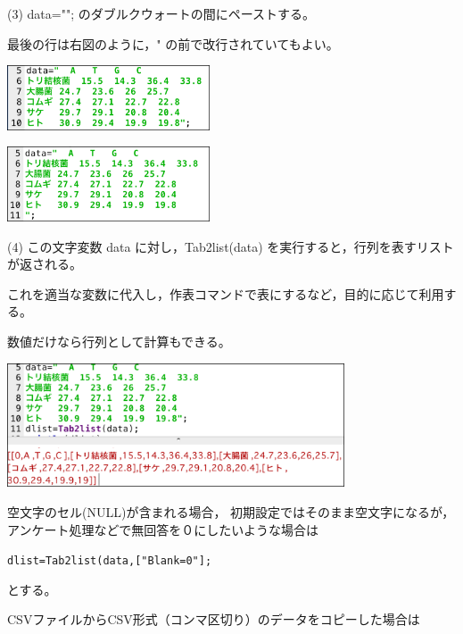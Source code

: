 \documentclass[papersize,a4paper,12pt,uplatex]{jsarticle}
\begin{document}
\begin{description}
\vspace{\baselineskip}
(3) data=""; のダブルクウォートの間にペーストする。

最後の行は右図のように，" の前で改行されていてもよい。

\vspace{\baselineskip}
\hspace{10mm} \includegraphics[bb=0 0 369.02 118.01 , width=6cm]{Fig/tab2list00.pdf}

\hspace{10mm} \includegraphics[bb=0 0 374.02 138.01 , width=6cm]{Fig/tab2list001.pdf}
    
\vspace{\baselineskip}
(4) この文字変数 data に対し，Tab2list(data) を実行すると，行列を表すリストが返される。

これを適当な変数に代入し，作表コマンドで表にするなど，目的に応じて利用する。
  
数値だけなら行列として計算もできる。

\vspace{\baselineskip} 
\hspace{10mm} \includegraphics[bb=0 0 622.53 228.51 , width=10cm]{Fig/tab2list03.pdf}

\vspace{\baselineskip}
  空文字のセル(NULL)が含まれる場合， 初期設定ではそのまま空文字になるが，アンケート処理などで無回答を０にしたいような場合は
  
\hspace{10mm}\verb|dlist=Tab2list(data,["Blank=0"];|

とする。
 
 CSVファイルからCSV形式（コンマ区切り）のデータをコピーした場合は
 

\end{description}
\end{document}
